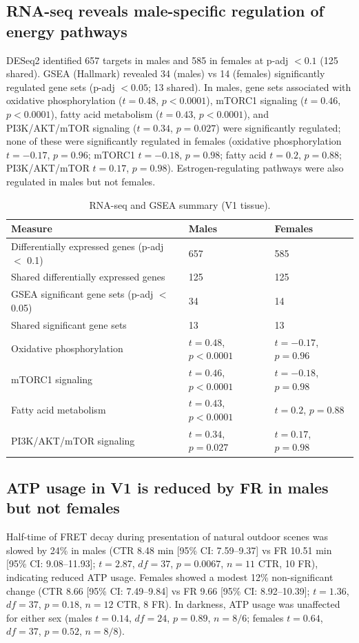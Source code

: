 \documentclass[11pt]{article}
\begin{document}
\subsection{RNA-seq reveals male-specific regulation of energy pathways}
DESeq2 identified 657 targets in males and 585 in females at p-adj $< 0.1$ (125 shared). GSEA (Hallmark) revealed 34 (males) vs 14 (females) significantly regulated gene sets (p-adj $< 0.05$; 13 shared). In males, gene sets associated with oxidative phosphorylation ($t = 0.48$, $p < 0.0001$), mTORC1 signaling ($t = 0.46$, $p < 0.0001$), fatty acid metabolism ($t = 0.43$, $p < 0.0001$), and PI3K/AKT/mTOR signaling ($t = 0.34$, $p = 0.027$) were significantly regulated; none of these were significantly regulated in females (oxidative phosphorylation $t = -0.17$, $p = 0.96$; mTORC1 $t = -0.18$, $p = 0.98$; fatty acid $t = 0.2$, $p = 0.88$; PI3K/AKT/mTOR $t = 0.17$, $p = 0.98$). Estrogen-regulating pathways were also regulated in males but not females.

\begin{table}[h]
\centering
\caption{RNA-seq and GSEA summary (V1 tissue).}
\begin{tabular}{lll}
\toprule
Measure & Males & Females \\
\midrule
Differentially expressed genes (p-adj $<$ 0.1) & 657 & 585 \\
Shared differentially expressed genes & 125 & 125 \\
GSEA significant gene sets (p-adj $<$ 0.05) & 34 & 14 \\
Shared significant gene sets & 13 & 13 \\
Oxidative phosphorylation & $t = 0.48$, $p < 0.0001$ & $t = -0.17$, $p = 0.96$ \\
mTORC1 signaling & $t = 0.46$, $p < 0.0001$ & $t = -0.18$, $p = 0.98$ \\
Fatty acid metabolism & $t = 0.43$, $p < 0.0001$ & $t = 0.2$, $p = 0.88$ \\
PI3K/AKT/mTOR signaling & $t = 0.34$, $p = 0.027$ & $t = 0.17$, $p = 0.98$ \\
\bottomrule
\end{tabular}
\end{table}

\subsection{ATP usage in V1 is reduced by FR in males but not females}
Half-time of FRET decay during presentation of natural outdoor scenes was slowed by 24\% in males (CTR 8.48 min [95\% CI: 7.59--9.37] vs FR 10.51 min [95\% CI: 9.08--11.93]; $t = 2.87$, $df = 37$, $p = 0.0067$, $n = 11$ CTR, 10 FR), indicating reduced ATP usage. Females showed a modest 12\% non-significant change (CTR 8.66 [95\% CI: 7.49--9.84] vs FR 9.66 [95\% CI: 8.92--10.39]; $t = 1.36$, $df = 37$, $p = 0.18$, $n = 12$ CTR, 8 FR). In darkness, ATP usage was unaffected for either sex (males $t = 0.14$, $df = 24$, $p = 0.89$, $n = 8/6$; females $t = 0.64$, $df = 37$, $p = 0.52$, $n = 8/8$).
\end{document}

